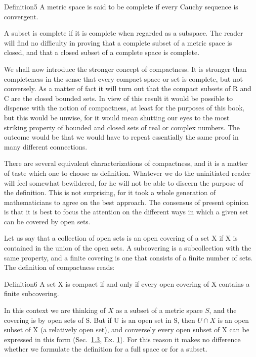 \begin{originalstatement}{Definition}{5}\label{def:3.5}
A metric space is said to be complete if every Cauchy sequence is convergent.
\end{originalstatement}
A subset is complete if it is complete when regarded as a subspace. The reader will find no difficulty in proving that a complete subset of a metric space is closed, and that a closed subset of a complete space is complete.

We shall now introduce the stronger concept of compactness. It is stronger than completeness in the sense that every compact space or set is complete, but not conversely. As a matter of fact it will turn out that the compact subsets of R and C are the closed bounded sets. In view of this result it would be possible to dispense with the notion of compactness, at least for the purposes of this book, but this would be unwise, for it would mean shutting our eyes to the most striking property of bounded and closed sets of real or complex numbers. The outcome would be that we would have to repeat essentially the same proof in many different connections.

There are several equivalent characterizations of compactness, and it is a matter of taste which one to choose as definition. Whatever we do the uninitiated reader will feel somewhat bewildered, for he will not be able to discern the purpose of the definition. This is not surprising, for it took a whole generation of mathematicians to agree on the best approach. The consensus of present opinion is that it is best to focus the attention on the different ways in which a given set can be covered by open sets.

Let us say that a collection of open sets is an open covering of a set X if X is contained in the union of the open sets. A subcovering is a subcollection with the same property, and a finite covering is one that consists of a finite number of sets. The definition of compactness reads:

\begin{originalstatement}{Definition}{6}\label{def:3.6}
A set X is compact if and only if every open covering of X contains a finite subcovering.
\end{originalstatement}
In this context we are thinking of $X$ as a subset of a metric space $S$,
and the covering is by open sets of S. But if U is an open set in S, then $U \cap X$ is an open subset of X (a relatively open set), and conversely every open subset of X can be expressed in this form (Sec.~\hyperref[sec:3.1.3]{1.3}, Ex. \hyperref[exercise:3.1.3.2.1]{1}). For this reason it makes no difference whether we formulate the definition for a full space or for a subset.

